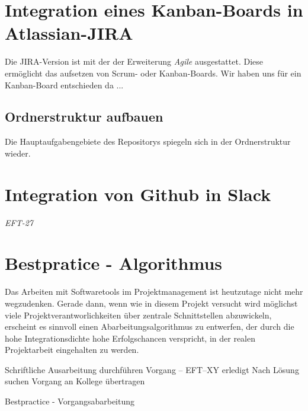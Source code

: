 \documentclass{article}
\begin{document}
\section{Integration eines Kanban-Boards in Atlassian-JIRA}
Die JIRA-Version ist mit der der Erweiterung \emph{Agile} ausgestattet. 
Diese ermöglicht das aufsetzen von Scrum- oder Kanban-Boards. Wir haben uns für ein Kanban-Board entschieden da ... 


\subsection{Ordnerstruktur aufbauen}
Die Hauptaufgabengebiete des Repositorys spiegeln sich in der Ordnerstruktur wieder.

\DTsetlength{0.2em}{3em}{0.2em}{0.4pt}{2.6pt}


\section{Integration von Github in Slack}
\emph{EFT-27}


\section{Bestpratice - Algorithmus}
Das Arbeiten mit Softwaretools im Projektmanagement ist heutzutage nicht mehr wegzudenken. Gerade dann, wenn wie in diesem Projekt versucht wird möglichst viele Projektverantworlichkeiten über zentrale Schnittstellen abzuwickeln, erscheint es sinnvoll einen Abarbeitungsalgorithmus zu entwerfen, der durch die hohe Integrationsdichte hohe Erfolgschancen verspricht, in der realen Projektarbeit eingehalten zu werden.\\ 

\begin{algorithm}[H]
  {
    {
   Schriftliche Ausarbeitung durchführen\;
    {
  	  \Return Vorgang -- EFT--XY erledigt\;
     } {}  
  }
   {
	Nach Lösung suchen\;  
	 {
	  \Return Vorgang an Kollege übertragen\;
	} {}
  }
}    
\caption{Bestpractice - Vorgangsabarbeitung}
\end{algorithm}


\begin{thebibliography}{}

\end{thebibliography}
\end{document}
